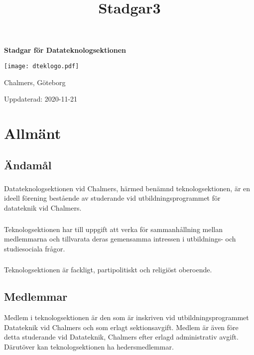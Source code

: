 \documentclass[a4paper]{dtek}
\title{Stadgar3}
\newcommand{\updated}{2020-11-21} %
\begin{document}
\makeheadfoot

\vspace*{\fill}
\begin{center}
{\Huge \textbf{Stadgar för Datateknologsektionen}}
\par\bigskip
\texttt{[image: dteklogo.pdf]}
\par\bigskip
{\LARGE Chalmers, Göteborg}
\end{center}
\vspace*{\fill}
\begin{center}
{\LARGE Uppdaterad: \updated}
\end{center}
\vspace*{\fill}


\newpage
\setcounter{tocdepth}{1}
\tableofcontents
\newpage

\section{Allmänt}
\subsection{Ändamål}
\subsubsection{}
Datateknologsektionen vid Chalmers, härmed benämnd teknologsektionen, är en ideell förening bestående av studerande vid utbildningsprogrammet för datateknik vid Chalmers.
\subsubsection{}
Teknologsektionen har till uppgift att verka för sammanhållning mellan medlemmarna och tillvarata deras gemensamma intressen i utbildnings- och studiesociala frågor.
\subsubsection{}
Teknologsektionen är fackligt, partipolitiskt och religiöst oberoende.
\subsection{Medlemmar}
Medlem i teknologsektionen är den som är inskriven vid utbildningsprogrammet Datateknik vid Chalmers och som erlagt sektionsavgift. Medlem är även före detta studerande vid Datateknik, Chalmers efter erlagd administrativ avgift. Därutöver kan teknologsektionen ha hedersmedlemmar.
\end{document}
